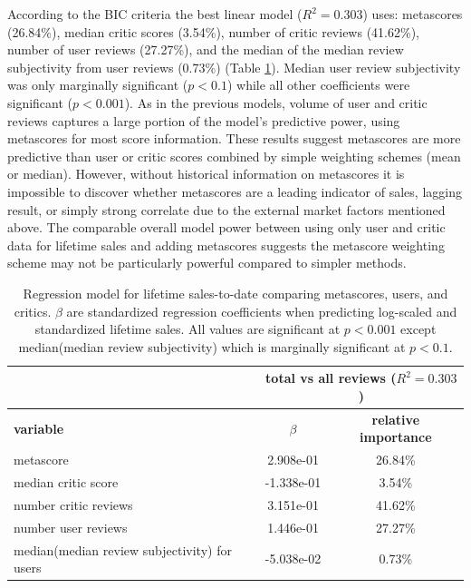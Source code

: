 \documentclass[letterpaper]{article}
\begin{document}
According to the BIC criteria the best linear model ($R^2 = 0.303$) uses: metascores (26.84\%), median critic scores (3.54\%), number of critic reviews (41.62\%), number of user reviews (27.27\%), and the median of the median review subjectivity from user reviews (0.73\%) (Table \ref{tab:sales_metascore_lm}). Median user review subjectivity was only marginally significant ($p < 0.1$) while all other coefficients were significant ($p < 0.001$). As in the previous models, volume of user and critic reviews captures a large portion of the model's predictive power, using metascores for most score information. These results suggest metascores are more predictive than user or critic scores combined by simple weighting schemes (mean or median). However, without historical information on metascores it is impossible to discover whether metascores are a leading indicator of sales, lagging result, or simply strong correlate due to the external market factors mentioned above. The comparable overall model power between using only user and critic data for lifetime sales and adding metascores suggests the metascore weighting scheme may not be particularly powerful compared to simpler methods.

\begin{table}[tb]
\centering
\scriptsize
\begin{tabularx}{\linewidth}{|X|c|c|}
\hline  & \multicolumn{2}{|c|}{\textbf{total vs all reviews} ($R^2 = 0.303$)}\\ 
\hline \textbf{variable} & \textbf{$\beta$} & \textbf{relative importance}\\ 
\hline metascore & 2.908e-01 & 26.84\%\\ 
\hline median critic score & -1.338e-01 & 3.54\%\\ 
\hline number critic reviews & 3.151e-01 & 41.62\%\\ 
\hline number user reviews & 1.446e-01 & 27.27\%\\ 
\hline median(median review subjectivity) for users & -5.038e-02 & 0.73\%\\ 
\hline 
\end{tabularx}
\label{tab:sales_metascore_lm}
\caption{Regression model for lifetime sales-to-date comparing metascores, users, and critics. $\beta$ are standardized regression coefficients when predicting log-scaled and standardized lifetime sales. All values are significant at $p < 0.001$ except median(median review subjectivity) which is marginally significant at $p < 0.1$.}
\end{table}
\end{document}
